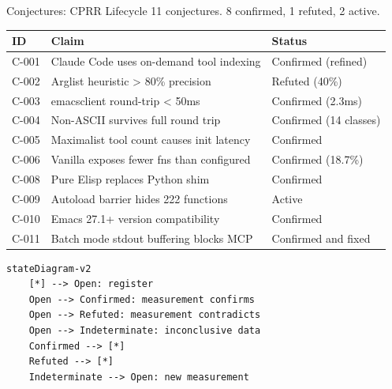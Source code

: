 \documentclass[presentation]{beamer}
\begin{document}
\begin{frame}[label={sec:org81e3b7c},fragile]{Conjectures: CPRR Lifecycle}
 11 conjectures. 8 confirmed, 1 refuted, 2 active.

\begin{center}
\begin{tabular}{lll}
ID & Claim & Status\\
\hline
C-001 & Claude Code uses on-demand tool indexing & Confirmed (refined)\\
C-002 & Arglist heuristic > 80\% precision & Refuted (40\%)\\
C-003 & emacsclient round-trip < 50ms & Confirmed (2.3ms)\\
C-004 & Non-ASCII survives full round trip & Confirmed (14 classes)\\
C-005 & Maximalist tool count causes init latency & Confirmed\\
C-006 & Vanilla exposes fewer fns than configured & Confirmed (18.7\%)\\
C-008 & Pure Elisp replaces Python shim & Confirmed\\
C-009 & Autoload barrier hides 222 functions & Active\\
C-010 & Emacs 27.1+ version compatibility & Confirmed\\
C-011 & Batch mode stdout buffering blocks MCP & Confirmed and fixed\\
\end{tabular}
\end{center}

\begin{verbatim}
stateDiagram-v2
    [*] --> Open: register
    Open --> Confirmed: measurement confirms
    Open --> Refuted: measurement contradicts
    Open --> Indeterminate: inconclusive data
    Confirmed --> [*]
    Refuted --> [*]
    Indeterminate --> Open: new measurement
\end{verbatim}
\end{frame}
\end{document}
